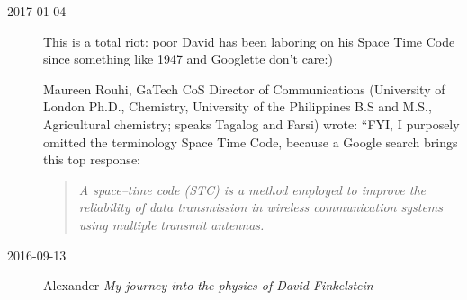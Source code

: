 \begin{description}
\item[2017-01-04]
This is a total riot: poor David has been laboring on his Space Time Code
since something like 1947 and Googlette don't care:)


 {Maureen Rouhi},
GaTech CoS Director of Communications (University of London
Ph.D., Chemistry, University of the Philippines
B.S and M.S., Agricultural chemistry; speaks Tagalog and Farsi)
wrote:
``FYI, I purposely omitted the terminology Space Time Code, because a
Google search brings this top response:

\begin{quote}
{\em A space–time code (STC) is a method employed to improve the
reliability of data transmission in wireless communication systems using
multiple transmit antennas.}
\end{quote}

\item[2016-09-13]
Alexander
{\em My journey into the physics of {David Finkelstein}}



\end{description}

\printbibliography[heading=subbibintoc,title={References}]
